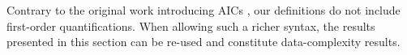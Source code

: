 Contrary to the original work introducing AICs \cite{ppdp/FlescaGZ04}, our definitions do not include first-order quantifications. 
When allowing such a richer syntax, the results presented in this section can be re-used and constitute data-complexity results. 








